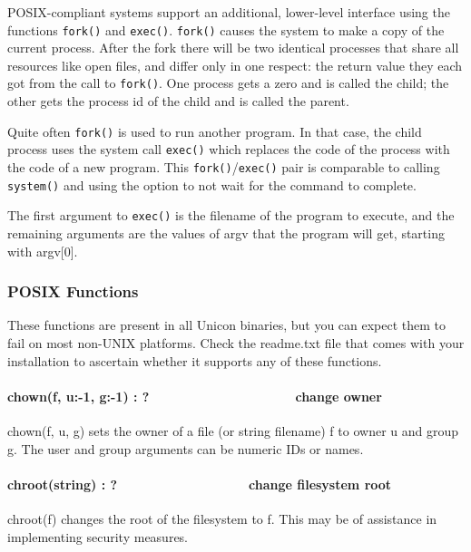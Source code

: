 POSIX-compliant systems support an additional, lower-level interface
using the functions \texttt{fork()} and \texttt{exec()}.
\texttt{fork()} causes the
system to make a copy of the current process. After the fork there will
be two identical processes that share all resources like open files,
and differ only in one respect: the return value they each got from the
call to \texttt{fork()}. One process gets a zero and is called the child; the
other gets the process id of the child and is called the parent.

Quite often \texttt{fork()} is used to run another program. In that case, the
child process uses the system call \texttt{exec()} which replaces the code of
the process with the code of a new program. This \texttt{fork()}/\texttt{exec()} pair is
comparable to calling \texttt{system()} and using the option to not wait for the
command to complete.

The first argument to \texttt{exec()} is the filename of the program to execute,
and the remaining arguments are the values of argv that the program
will get, starting with argv[0]. 


\subsubsection{POSIX Functions}

These functions are present in all Unicon binaries, but you can expect
them to fail on most non-UNIX platforms. Check the readme.txt file that
comes with your installation to ascertain whether it supports any of
these functions.

\paragraph[chown(f, u:{}-1, g:{}-1) : ?\ \ \ \ \ \ \ \ \ \ \ \ 
\ \ \ \ \ \ \ \ change owner]{chown(f, u:-1, g:-1) :
?\ \ \ \ \ \ \ \ \ \ \ \  \ \ \ \ \ \ \ \ change owner}
chown(f, u, g) sets the owner of a file (or string filename) f to owner
u and group g. The user and group arguments can be numeric
ID{\textquotesingle}s or names.

\paragraph[chroot(string) : ?\ \ \ \ \ \ \ \ \ \ \ \  \ \ \ \ \ \ change
filesystem root]{chroot(string) : ?\ \ \ \ \ \ \ \ \ \ \ \ 
\ \ \ \ \ \ change filesystem root}
chroot(f) changes the root of the filesystem to f. This may be of
assistance in implementing security measures.

